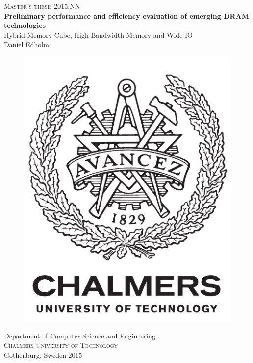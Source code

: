 \newpage
\thispagestyle{empty}
\begin{center}
	\textsc{\large Master's thesis 2015:NN}\\[4cm]
	\textbf{\Large Preliminary performance and efficiency evaluation of emerging DRAM technologies} \\[1cm]
	{\large Hybrid Memory Cube, High Bandwidth Memory and Wide-IO}\\[1cm]
	{\large Daniel Edholm}
	
	\vfill	
	\begin{figure}[h!]
	\centering
	\includegraphics[width=0.2\pdfpagewidth]{figure/auxiliary/logo_eng.pdf} \\	
	\end{figure}	\vspace{5mm}	
	
	Department of Computer Science and Engineering \\
	\textsc{Chalmers University of Technology} \\
	Gothenburg, Sweden 2015 \\
\end{center}



